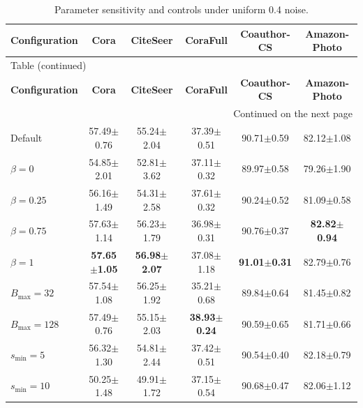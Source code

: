 \begingroup
\fontsize{9}{11}\selectfont
\setlength{\tabcolsep}{5pt}
\renewcommand{\arraystretch}{1.15}
\begin{longtable}{@{}lccccc@{}}
\caption{Parameter sensitivity and controls under uniform 0.4 noise.}\label{tab:I.1}\\
\toprule
\textbf{Configuration} & \textbf{Cora} & \textbf{CiteSeer} & \textbf{CoraFull} & \textbf{Coauthor-CS} & \textbf{Amazon-Photo} \\
\midrule
\endfirsthead
\multicolumn{6}{l}{\small Table \thetable{} (continued)}\\
\toprule
\textbf{Configuration} & \textbf{Cora} & \textbf{CiteSeer} & \textbf{CoraFull} & \textbf{Coauthor-CS} & \textbf{Amazon-Photo} \\
\midrule
\endhead
\midrule\multicolumn{6}{r}{\small Continued on the next page}\\
\endfoot
\bottomrule
\endlastfoot
Default & 57.49\ensuremath{\pm}0.76 & 55.24\ensuremath{\pm}2.04 & 37.39\ensuremath{\pm}0.51 & 90.71\ensuremath{\pm}0.59 & 82.12\ensuremath{\pm}1.08 \\
\(\beta=0\) & 54.85\ensuremath{\pm}2.01 & 52.81\ensuremath{\pm}3.62 & 37.11\ensuremath{\pm}0.32 & 89.97\ensuremath{\pm}0.58 & 79.26\ensuremath{\pm}1.90 \\
\(\beta=0.25\) & 56.16\ensuremath{\pm}1.49 & 54.31\ensuremath{\pm}2.58 & 37.61\ensuremath{\pm}0.32 & 90.24\ensuremath{\pm}0.52 & 81.09\ensuremath{\pm}0.58 \\
\(\beta=0.75\) & 57.63\ensuremath{\pm}1.14 & 56.23\ensuremath{\pm}1.79 & 36.98\ensuremath{\pm}0.31 & 90.76\ensuremath{\pm}0.37 & \textbf{82.82\ensuremath{\pm}0.94} \\
\(\beta=1\) & \textbf{57.65\ensuremath{\pm}1.05} & \textbf{56.98\ensuremath{\pm}2.07} & 37.08\ensuremath{\pm}1.18 & \textbf{91.01\ensuremath{\pm}0.31} & 82.79\ensuremath{\pm}0.76 \\
\(B_{\max}=32\) & 57.54\ensuremath{\pm}1.08 & 56.25\ensuremath{\pm}1.92 & 35.21\ensuremath{\pm}0.68 & 89.84\ensuremath{\pm}0.64 & 81.45\ensuremath{\pm}0.82 \\
\(B_{\max}=128\) & 57.49\ensuremath{\pm}0.76 & 55.15\ensuremath{\pm}2.03 & \textbf{38.93\ensuremath{\pm}0.24} & 90.59\ensuremath{\pm}0.65 & 81.71\ensuremath{\pm}0.66 \\
\(s_{\min}=5\) & 56.32\ensuremath{\pm}1.30 & 54.81\ensuremath{\pm}2.44 & 37.42\ensuremath{\pm}0.51 & 90.54\ensuremath{\pm}0.40 & 82.18\ensuremath{\pm}0.79 \\
\(s_{\min}=10\) & 50.25\ensuremath{\pm}1.48 & 49.91\ensuremath{\pm}1.72 & 37.15\ensuremath{\pm}0.54 & 90.68\ensuremath{\pm}0.47 & 82.06\ensuremath{\pm}1.12 \\

\end{longtable}
